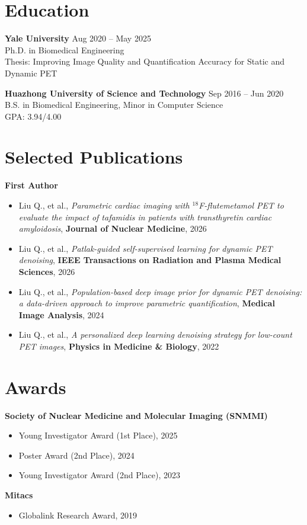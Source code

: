 \section{Education}
\textbf{Yale University} \hfill Aug 2020 -- May 2025 \\
Ph.D. in Biomedical Engineering \\
Thesis: Improving Image Quality and Quantification Accuracy for Static and Dynamic PET

\textbf{Huazhong University of Science and Technology} \hfill Sep 2016 -- Jun 2020 \\
B.S. in Biomedical Engineering, Minor in Computer Science \\
GPA: 3.94/4.00

\section{Selected Publications}
\textbf{First Author}
\begin{itemize}[leftmargin=*]
\item Liu Q., et al., \textit{Parametric cardiac imaging with $^{18}$F-flutemetamol PET to evaluate the impact of tafamidis in patients with transthyretin cardiac amyloidosis}, \textbf{Journal of Nuclear Medicine}, 2026
\item Liu Q., et al., \textit{Patlak-guided self-supervised learning for dynamic PET denoising}, \textbf{IEEE Transactions on Radiation and Plasma Medical Sciences}, 2026
\item Liu Q., et al., \textit{Population-based deep image prior for dynamic PET denoising: a data-driven approach to improve parametric quantification}, \textbf{Medical Image Analysis}, 2024
\item Liu Q., et al., \textit{A personalized deep learning denoising strategy for low-count PET images}, \textbf{Physics in Medicine \& Biology}, 2022
\end{itemize}

\section{Awards}
\textbf{Society of Nuclear Medicine and Molecular Imaging (SNMMI)}
\begin{itemize}[leftmargin=*]
\item Young Investigator Award (1st Place), 2025
\item Poster Award (2nd Place), 2024
\item Young Investigator Award (2nd Place), 2023
\end{itemize}

\textbf{Mitacs}
\begin{itemize}[leftmargin=*]
\item Globalink Research Award, 2019
\end{itemize}